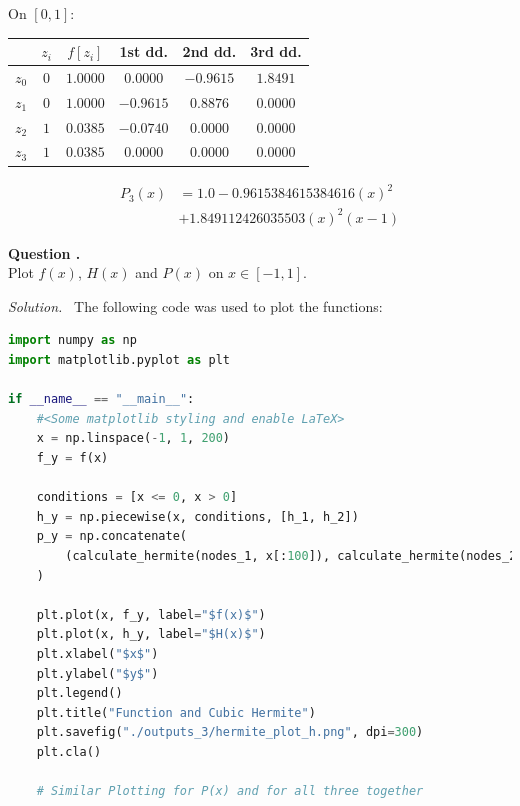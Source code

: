 \documentclass[12pt]{article}
\newcounter{question}
\newcounter{subquest}
\newcommand{\subquestion}[1][true]{
    \stepcounter{subquest} 
    \ifthenelse{\equal{#1}{true} \and \value{subquest}>1}{\newpage}{}
    \vspace{1em}
    \textbf{\large Question \thequestion.\thesubquest}
    \vspace{.5em}\ \\}
\newcommand{\solution}
    {\par\vspace{0.5em}\noindent\emph{Solution.}\ }
    {\par\vspace{1em}}
\begin{document}
On $[0,1]$:
\begin{center}
\begin{tabular}{|c|c|c|c|c|c|}
\hline
& $z_i$ & $f[z_i]$ & 1st dd. & 2nd dd. & 3rd dd. \\
\hline
$z_0$ & $0$ & $1.0000$ & $0.0000$ & $-0.9615$ & $1.8491$ \\ 
$z_1$ & $0$ & $1.0000$ & $-0.9615$ & $0.8876$ & $0.0000$ \\ 
$z_2$ & $1$ & $0.0385$ & $-0.0740$ & $0.0000$ & $0.0000$ \\ 
$z_3$ & $1$ & $0.0385$ & $0.0000$ & $0.0000$ & $0.0000$ \\ 
\hline
\end{tabular}
\end{center}
\begin{align*}
    P_{3}(x) &= 1.0 - 0.9615384615384616(x)^2\\ 
    &+ 1.849112426035503(x)^2(x - 1)
\end{align*}

\subquestion
Plot $f(x)$, $H(x)$ and $P(x)$ on $x\in[-1,1]$.

\solution
The following code was used to plot the functions:
\begin{lstlisting}[language=Python, caption=1.4 Python]
import numpy as np
import matplotlib.pyplot as plt

if __name__ == "__main__":
    #<Some matplotlib styling and enable LaTeX>
    x = np.linspace(-1, 1, 200)
    f_y = f(x)

    conditions = [x <= 0, x > 0]
    h_y = np.piecewise(x, conditions, [h_1, h_2])
    p_y = np.concatenate(
        (calculate_hermite(nodes_1, x[:100]), calculate_hermite(nodes_2, x[100:]))
    )
    
    plt.plot(x, f_y, label="$f(x)$")
    plt.plot(x, h_y, label="$H(x)$")
    plt.xlabel("$x$")
    plt.ylabel("$y$")
    plt.legend()
    plt.title("Function and Cubic Hermite")
    plt.savefig("./outputs_3/hermite_plot_h.png", dpi=300)
    plt.cla()
    
    # Similar Plotting for P(x) and for all three together
\end{lstlisting}
\end{document}
